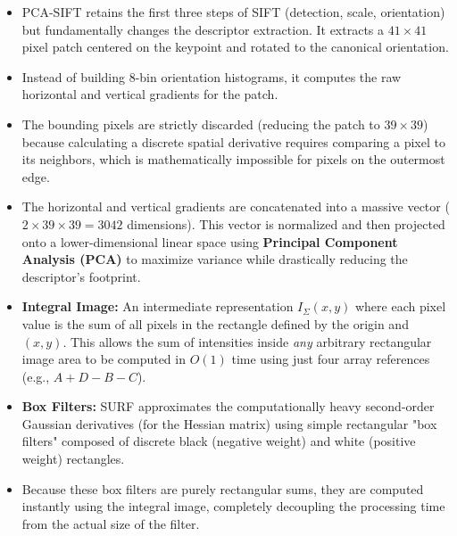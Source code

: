 
{
\begin{itemize}
    \item PCA-SIFT retains the first three steps of SIFT (detection, scale, orientation) but fundamentally changes the descriptor extraction. It extracts a $41 \times 41$ pixel patch centered on the keypoint and rotated to the canonical orientation.
    \item Instead of building 8-bin orientation histograms, it computes the raw horizontal and vertical gradients for the patch. 
    \item The bounding pixels are strictly discarded (reducing the patch to $39 \times 39$) because calculating a discrete spatial derivative requires comparing a pixel to its neighbors, which is mathematically impossible for pixels on the outermost edge.
    \item The horizontal and vertical gradients are concatenated into a massive vector ($2 \times 39 \times 39 = 3042$ dimensions). This vector is normalized and then projected onto a lower-dimensional linear space using \textbf{Principal Component Analysis (PCA)} to maximize variance while drastically reducing the descriptor's footprint.
\end{itemize}}

{
\begin{itemize}
    \item \textbf{Integral Image:} An intermediate representation $I_\Sigma(x,y)$ where each pixel value is the sum of all pixels in the rectangle defined by the origin and $(x,y)$. This allows the sum of intensities inside \textit{any} arbitrary rectangular image area to be computed in $O(1)$ time using just four array references (e.g., $A + D - B - C$).
    \item \textbf{Box Filters:} SURF approximates the computationally heavy second-order Gaussian derivatives (for the Hessian matrix) using simple rectangular "box filters" composed of discrete black (negative weight) and white (positive weight) rectangles.
    \item Because these box filters are purely rectangular sums, they are computed instantly using the integral image, completely decoupling the processing time from the actual size of the filter.
\end{itemize}}

